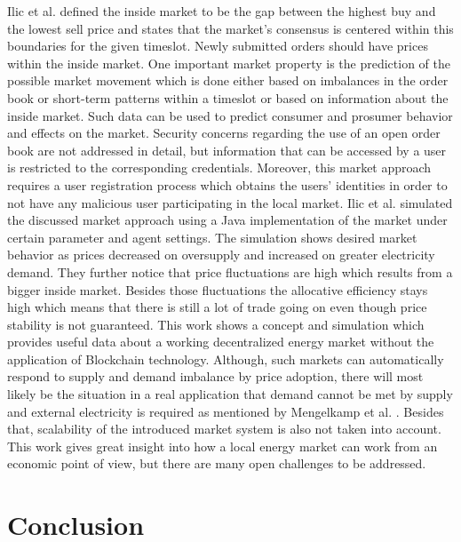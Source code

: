 \documentclass[runningheads]{llncs}
\begin{document}
Ilic et al. \cite{ilic_smart_grid_neighbourhoods} defined the inside market to be the gap between the highest buy and the lowest sell price and states that the market’s consensus is centered within this boundaries for the given timeslot. Newly submitted orders should have prices within the inside market.
One important market property is the prediction of the possible market movement which is done either based on imbalances in the order book or short-term patterns within a timeslot or based on information about the inside market. Such data can be used to predict consumer and prosumer behavior and effects on the market. \newline
Security concerns regarding the use of an open order book are not addressed in detail, but information that can be accessed by a user is restricted to the corresponding credentials. Moreover, this market approach requires a user registration process which obtains the users’ identities in order to not have any malicious user participating in the local market. \newline
Ilic et al. \cite{ilic_smart_grid_neighbourhoods} simulated the discussed market approach using a Java implementation of the market under certain parameter and agent settings. The simulation shows desired market behavior as prices decreased on oversupply and increased on greater electricity demand. They further notice that price fluctuations are high which results from a bigger inside market. Besides those fluctuations the allocative efficiency stays high which means that there is still a lot of trade going on even though price stability is not guaranteed. \newline
This work shows a concept and simulation which provides useful data about a working decentralized energy market without the application of Blockchain technology. Although, such markets can automatically respond to supply and demand imbalance by price adoption, there will most likely be the situation in a real application that demand cannot be met by supply and external electricity is required as mentioned by Mengelkamp et al. \cite{mengelkamp_lem}. Besides that, scalability of the introduced market system is also not taken into account. This work gives great insight into how a local energy market can work from an economic point of view, but there are many open challenges to be addressed.


\section{Conclusion}
\end{document}

